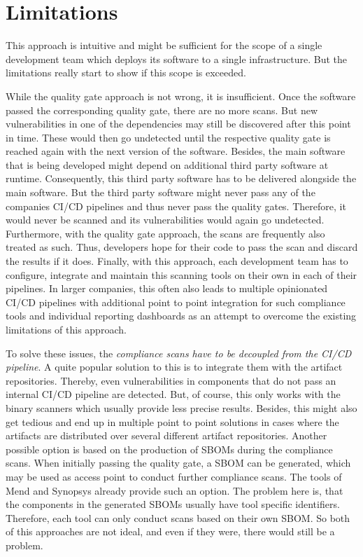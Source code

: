 \section{Limitations}
This approach is intuitive and might be sufficient for the scope of a single development team which deploys its software to a single infrastructure. But the limitations really start to show if this scope is exceeded.\par
While the quality gate approach is not wrong, it is insufficient. Once the software passed the corresponding quality gate, there are no more scans. But new vulnerabilities in one of the dependencies may still be discovered after this point in time. These would then go undetected until the respective quality gate is reached again with the next version of the software. Besides, the main software that is being developed might depend on additional third party software at runtime. Consequently, this third party software has to be delivered alongside the main software. But the third party software might never pass any of the companies CI/CD pipelines and thus never pass the quality gates. Therefore, it would never be scanned and its vulnerabilities would again go undetected. Furthermore, with the quality gate approach, the scans are frequently also treated as such. Thus, developers hope for their code to pass the scan and discard the results if it does. Finally, with this approach, each development team has to configure, integrate and maintain this scanning tools on their own in each of their pipelines. In larger companies, this often also leads to multiple opinionated CI/CD pipelines with additional point to point integration for such compliance tools and individual reporting dashboards as an attempt to overcome the existing limitations of this approach.\par
To solve these issues, the \textit{compliance scans have to be decoupled from the CI/CD pipeline}. A quite popular solution to this is to integrate them with the artifact repositories. Thereby, even vulnerabilities in components that do not pass an internal CI/CD pipeline are detected. But, of course, this only works with the binary scanners which usually provide less precise results. Besides, this might also get tedious and end up in multiple point to point solutions in cases where the artifacts are distributed over several different artifact repositories. Another possible option is based on the production of SBOMs during the compliance scans. When initially passing the quality gate, a SBOM can be generated, which may be used as access point to conduct further compliance scans. The tools of Mend and Synopsys already provide such an option. The problem here is, that the components in the generated SBOMs usually have tool specific identifiers. Therefore, each tool can only conduct scans based on their own SBOM. So both of this approaches are not ideal, and even if they were, there would still be a problem.\par
